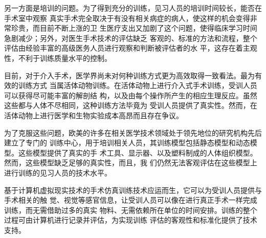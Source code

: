 另一方面是培训的问题。为了得到充分的训练，见习人员的培训时间较长，能否在手术室中观察
真实手术完全取决于有没有相关病症的病人，使这样的机会变得非常珍贵，而目前不断上涨的卫
生医疗支出又加剧了这个问题，使得临床学习时间急剧减少；另外，对医生手术技术的评估缺乏
客观的、标准的方法和流程，整个评估由经验丰富的高级医务人员进行观察和判断被评估者的水
平，这存在着主观性，不利于训练质量水平的控制。

目前，对于介入手术，医学界尚未对何种训练方式更为高效取得一致看法。最为有效的训练方式
当属活体动物训练。在活体动物上进行介入式手术训练，受训人员可以获得尽可能丰富的解剖结
构，以及由每个操作所产生的相应生理反应。虽然这些都与人体不尽相同，这种训练方法毕竟为
受训人员提供了真实性。然而，在活体动物上进行医学和生物实验成本高昂而且存在争议。

为了克服这些问题，欧美的许多在相关医学技术领域处于领先地位的研究机构先后建立了专门的
训练中心，用于培训相关人员，其训练模型包括静态模型和动态模型。这些模型提供了真实的手
术工具、显示器、以及塑料制成的人体组织模型。然而，这些模型缺乏足够的真实性，而且，我
们仍然无法客观评估在这些模型上进行训练的见习人员的技术水平。

基于计算机虚拟现实技术的手术仿真训练技术应运而生，它可以为受训人员提供与手术相关的触
觉、视觉等感官信息，让受训人员可以像在进行真正手术一样完成训练，而无需借助过多的真实
物料、无需依赖所在单位的时间安排。训练的整个过程可由计算机进行记录并评估，为实现训练
评估的客观性和标准化提供了技术支持。



